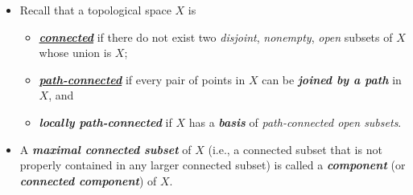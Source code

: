\documentclass[11pt]{article}
\begin{document}
\begin{itemize}
\item \begin{definition}
Recall that a topological space $X$ is
\begin{itemize}
\item \underline{\emph{\textbf{connected}}} if there do not exist two \emph{disjoint}, \emph{nonempty}, \emph{open} subsets of $X$ whose union is $X$;
\item \underline{\emph{\textbf{path-connected}}} if every pair of points in $X$ can be \emph{\textbf{joined by a path}} in $X$, and
\item \emph{\textbf{locally path-connected}} if $X$ has a \emph{\textbf{basis}} of \emph{path-connected open subsets}.
\end{itemize}
\end{definition}

\item \begin{definition}
A \emph{\textbf{maximal connected subset}} of $X$ (i.e., a connected subset that is not properly contained in any larger connected subset) is called a \emph{\textbf{component}} (or \emph{\textbf{connected component}}) of $X$.
\end{definition}
\end{itemize}
\end{document}
